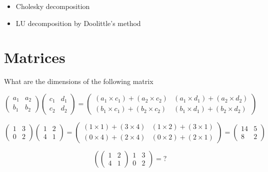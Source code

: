 \begin{itemize}
\begin{itemize}
\item Cholesky decomposition
\item LU decomposition by Doolittle's method
\end{itemize}
\newpage
\section{Matrices}

What are the dimensions of the following matrix


\[ \left(
\begin{array}{cc}
a_1 & a_2 \\ 
b_1 & b_2
\end{array} \right)\left(
\begin{array}{cc}
c_1 & d_1 \\ 
c_2 & d_2
\end{array} \right) = \left(
\begin{array}{cc}
(a_1 \times c_1) + (a_2 \times c_2) & (a_1 \times d_1) + (a_2 \times d_2) \\ 
(b_1 \times c_1) + (b_2 \times c_2) & (b_1 \times d_1) + (b_2 \times d_2)
\end{array} \right) \]

\bigskip
\large{
\[ \left(
\begin{array}{cc}
1 & 3 \\ 
0 & 2
\end{array} \right)\left(
\begin{array}{cc}
1 & 2 \\ 
4 & 1
\end{array} \right) = \left(
\begin{array}{cc}
(1 \times 1) + (3 \times 4) & (1 \times 2) + (3 \times 1) \\ 
(0 \times 4) + (2 \times 4) & (0 \times 2) + (2 \times 1)
\end{array} \right) = \left(
\begin{array}{cc}
14 & 5 \\ 
8 & 2
\end{array} \right) \]
}

\[ \left(
\left(
\begin{array}{cc}
1 & 2 \\ 
4 & 1
\end{array} \right)
\begin{array}{cc}
1 & 3 \\ 
0 & 2
\end{array} \right) = ? \]


\end{itemize}
